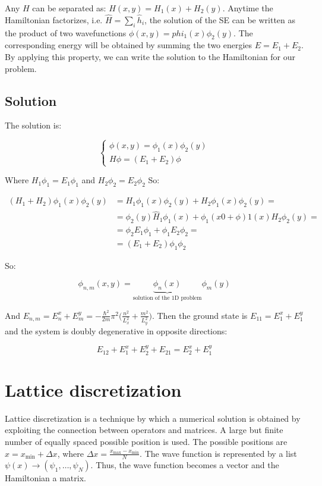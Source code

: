 Any $H$ can be separated as: $H(x,y) = H_1(x) + H_2(y)$.
Anytime the Hamiltonian factorizes, i.e. $\hat{H}=\sum_i{\hat{h}_i}$, the solution of the SE can be written as the product of two wavefunctions $\phi(x,y)=phi_1(x)\phi_2(y)$. The corresponding energy will be obtained by summing the two energies $E=E_1+E_2$. By applying this property, we can write the solution to the Hamiltonian for our problem.
  
  \subsection{Solution}
  The solution is:

  $$\begin{cases}\phi(x,y) = \phi_1(x)\phi_2(y)\\H\phi=(E_1+E_2)\phi\end{cases}$$

  Where $H_1\phi_1 = E_1\phi_1$  and $H_2\phi_2 = E_2\phi_2$
  So:

  \begin{align*}
    (H_1 + H_2)\phi_1(x)\phi_2(y) &= H_1\phi_1(x)\phi_2(y) + H_2\phi_1(x)\phi_2(y)=\\
                                  &= \phi_2(y)\hat{H}_1\phi_1(x)+\phi_1(x0+\phi)1(x)H_2\phi_2(y)=\\
                                  &= \phi_2 E_1\phi_1 + \phi_1E_2\phi_2=\\
                                  &=(E_1+E_2)\phi_1\phi_2
  \end{align*}

  So:

  $$\phi_{n,m}(x,y) = \underbrace{\phi_n(x)}_{\text{solution of the 1D problem}}\phi_m(y)$$

  And $E_{n,m} = E_n^x+E_m^y = -\frac{\hbar^2}{2m}\pi^2\biggl(\frac{n^2}{L_x^2}+\frac{m^2}{L_y^2}\biggr)$.
  Then the ground state is $E_{11} = E_1^x+E_1^y$ and the system is doubly degenerative in opposite directions:

  $$E_{12} + E_1^x+E_2^y + E_{21} = E_2^x+E_1^y$$

\section{Lattice discretization}
Lattice discretization is a technique by which a numerical solution is obtained by exploiting the connection between operators and matrices.
A large but finite number of equally spaced possible position is used.
The possible positions are $x = x_{\min} + \Delta x$, where $\Delta x = \frac{x_{\max}-x_{\min}}{N}$.
The wave function is represented by a list $\psi(x) \rightarrow(\psi_1,\dots, \psi_N)$.
Thus, the wave function becomes a vector and the Hamiltonian a matrix.

